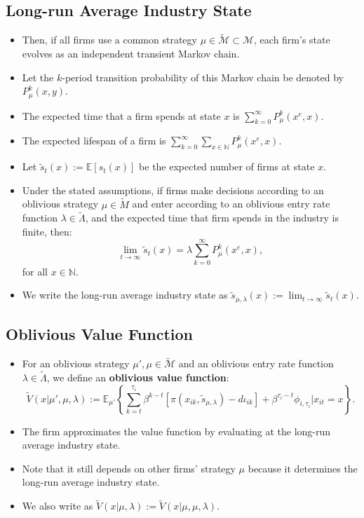 \documentclass[
]{book}
\providecommand{\tightlist}{%
  \setlength{\itemsep}{0pt}\setlength{\parskip}{0pt}}
\begin{document}
\hypertarget{long-run-average-industry-state}{%
\subsection{Long-run Average Industry State}\label{long-run-average-industry-state}}

\begin{itemize}
\tightlist
\item
  Then, if all firms use a common strategy \(\mu \in \widetilde{\mathcal{M}} \subset \mathcal{M}\), each firm's state evolves as an independent transient Markov chain.
\item
  Let the \(k\)-period transition probability of this Markov chain be denoted by \(P_{\mu}^k(x, y)\).
\item
  The expected time that a firm spends at state \(x\) is \(\sum_{k = 0}^\infty P_\mu^k(x^e, x)\).
\item
  The expected lifespan of a firm is \(\sum_{k = 0}^\infty \sum_{x \in \mathbb{N}} P_\mu^k(x^e, x)\).
\item
  Let \(\tilde{s}_t(x) := \mathbb{E}[s_t(x)]\) be the expected number of firms at state \(x\).
\item
  Under the stated assumptions, if firms make decisions according to an oblivious strategy \(\mu \in \widetilde{M}\) and enter according to an oblivious entry rate function \(\lambda \in \widetilde{\Lambda}\), and the expected time that firm spends in the industry is finite, then:
  \[
   \lim_{t \to \infty} \tilde{s}_t(x) = \lambda \sum_{k = 0}^\infty P_{\mu}^k(x^e, x),
   \]
  for all \(x \in \mathbb{N}\).
\item
  We write the long-run average industry state as \(\tilde{s}_{\mu, \lambda}(x) := \lim_{t \to \infty} \tilde{s}_t(x)\).
\end{itemize}

\hypertarget{oblivious-value-function}{%
\subsection{Oblivious Value Function}\label{oblivious-value-function}}

\begin{itemize}
\item
  For an oblivious strategy \(\mu', \mu \in \widetilde{\mathcal{M}}\) and an oblivious entry rate function \(\lambda \in \widetilde{\Lambda}\), we define an \textbf{oblivious value function}:
  \[
  \widetilde{V}(x|\mu', \mu, \lambda) := \mathbb{E}_{\mu'} \left\{\sum_{k = t}^{\tau_i} \beta^{k - t}[\pi(x_{ik}, \tilde{s}_{\mu, \lambda}) - d \iota_{ik}] + \beta^{\tau_i - t} \phi_{i, \tau_i}| x_{it} = x \right\}.
  \]
\item
  The firm approximates the value function by evaluating at the long-run average industry state.
\item
  Note that it still depends on other firms' strategy \(\mu\) because it determines the long-run average industry state.
\item
  We also write as \(\widetilde{V}(x|\mu, \lambda) := \widetilde{V}(x|\mu, \mu, \lambda)\).
\end{itemize}
\end{document}
